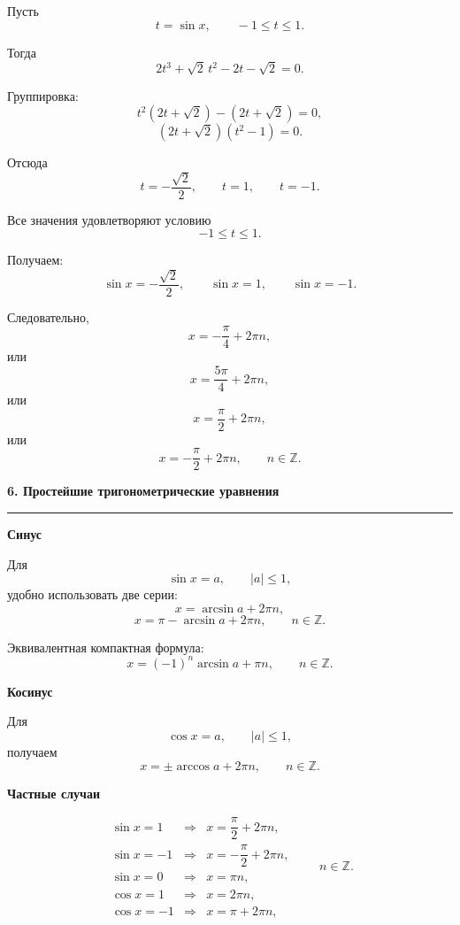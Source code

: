 \documentclass[a4paper,12pt]{article}
\newcommand{\checktitle}[1]{%
    \vspace{0.4em}
    {\Large\bfseries\textcolor{darkaccent}{#1}}\par
    \vspace{0.25em}
    {\color{accent!55}\rule{\linewidth}{0.6pt}}
    \vspace{0.45em}
}
\newcommand{\subcheck}[1]{%
    \vspace{0.25em}
    {\large\bfseries\textcolor{accent}{#1}}\par
    \vspace{0.15em}
}
\begin{document}
Пусть
\[
    t=\sin x,
    \qquad
    -1\le t\le1.
\]

Тогда
\[
    2t^3+\sqrt2\,t^2-2t-\sqrt2=0.
\]

Группировка:
\[
    t^2(2t+\sqrt2)-(2t+\sqrt2)=0,
\]
\[
    (2t+\sqrt2)(t^2-1)=0.
\]

Отсюда
\[
    t=-\frac{\sqrt2}{2},
    \qquad
    t=1,
    \qquad
    t=-1.
\]

Все значения удовлетворяют условию
\[
    -1\le t\le1.
\]

Получаем:
\[
    \sin x=-\frac{\sqrt2}{2},
    \qquad
    \sin x=1,
    \qquad
    \sin x=-1.
\]

Следовательно,
\[
    x=-\frac{\pi}{4}+2\pi n,
\]
или
\[
    x=\frac{5\pi}{4}+2\pi n,
\]
или
\[
    x=\frac{\pi}{2}+2\pi n,
\]
или
\[
    x=-\frac{\pi}{2}+2\pi n,
    \qquad n\in\mathbb Z.
\]


\checktitle{6. Простейшие тригонометрические уравнения}

\subcheck{Синус}

Для
\[
    \sin x=a,
    \qquad |a|\le1,
\]
удобно использовать две серии:
\[
    x=\arcsin a+2\pi n,
\]
\[
    x=\pi-\arcsin a+2\pi n,
    \qquad n\in\mathbb Z.
\]

Эквивалентная компактная формула:
\[
    x=(-1)^n\arcsin a+\pi n,
    \qquad n\in\mathbb Z.
\]

\subcheck{Косинус}

Для
\[
    \cos x=a,
    \qquad |a|\le1,
\]
получаем
\[
    x=\pm\arccos a+2\pi n,
    \qquad n\in\mathbb Z.
\]

\subcheck{Частные случаи}

\[
\begin{array}{ccl}
\sin x=1
&\Longrightarrow&
x=\dfrac{\pi}{2}+2\pi n,\\[0.3cm]

\sin x=-1
&\Longrightarrow&
x=-\dfrac{\pi}{2}+2\pi n,\\[0.3cm]

\sin x=0
&\Longrightarrow&
x=\pi n,\\[0.3cm]

\cos x=1
&\Longrightarrow&
x=2\pi n,\\[0.3cm]

\cos x=-1
&\Longrightarrow&
x=\pi+2\pi n,
\end{array}
\qquad n\in\mathbb Z.
\]

\end{document}
